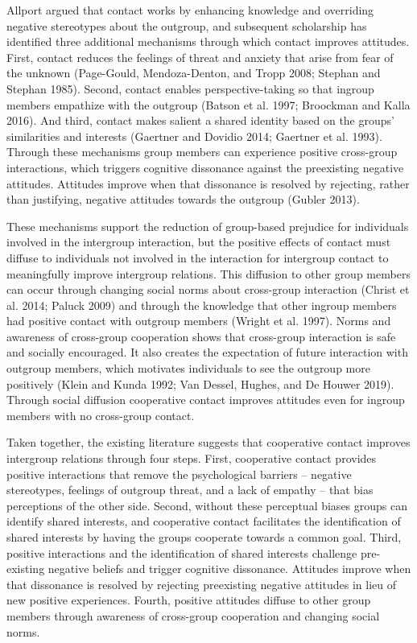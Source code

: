 \documentclass[11pt]{article}
\begin{document}
Allport argued that contact works by enhancing knowledge and overriding
negative stereotypes about the outgroup, and subsequent scholarship has
identified three additional mechanisms through which contact improves
attitudes. First, contact reduces the feelings of threat and anxiety
that arise from fear of the unknown (Page-Gould, Mendoza-Denton, and
Tropp 2008; Stephan and Stephan 1985). Second, contact enables
perspective-taking so that ingroup members empathize with the outgroup
(Batson et al. 1997; Broockman and Kalla 2016). And third, contact makes
salient a shared identity based on the groups' similarities and
interests (Gaertner and Dovidio 2014; Gaertner et al. 1993). Through
these mechanisms group members can experience positive cross-group
interactions, which triggers cognitive dissonance against the
preexisting negative attitudes. Attitudes improve when that dissonance
is resolved by rejecting, rather than justifying, negative attitudes
towards the outgroup (Gubler 2013).

These mechanisms support the reduction of group-based prejudice for
individuals involved in the intergroup interaction, but the positive
effects of contact must diffuse to individuals not involved in the
interaction for intergroup contact to meaningfully improve intergroup
relations. This diffusion to other group members can occur through
changing social norms about cross-group interaction (Christ et al. 2014;
Paluck 2009) and through the knowledge that other ingroup members had
positive contact with outgroup members (Wright et al. 1997). Norms and
awareness of cross-group cooperation shows that cross-group interaction
is safe and socially encouraged. It also creates the expectation of
future interaction with outgroup members, which motivates individuals to
see the outgroup more positively (Klein and Kunda 1992; Van Dessel,
Hughes, and De Houwer 2019). Through social diffusion cooperative
contact improves attitudes even for ingroup members with no cross-group
contact.

Taken together, the existing literature suggests that cooperative
contact improves intergroup relations through four steps. First,
cooperative contact provides positive interactions that remove the
psychological barriers -- negative stereotypes, feelings of outgroup
threat, and a lack of empathy -- that bias perceptions of the other
side. Second, without these perceptual biases groups can identify shared
interests, and cooperative contact facilitates the identification of
shared interests by having the groups cooperate towards a common goal.
Third, positive interactions and the identification of shared interests
challenge pre-existing negative beliefs and trigger cognitive
dissonance. Attitudes improve when that dissonance is resolved by
rejecting preexisting negative attitudes in lieu of new positive
experiences. Fourth, positive attitudes diffuse to other group members
through awareness of cross-group cooperation and changing social norms.
\end{document}
